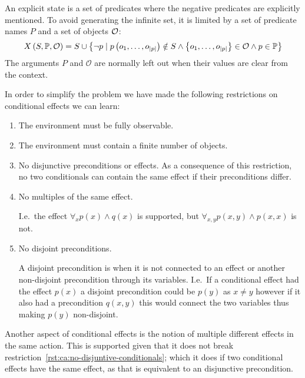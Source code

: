 \documentclass[\master/Master.tex]{subfiles}
\begin{document}
\begin{definition}
	An explicit state is a set of predicates where the negative predicates are explicitly mentioned. To avoid generating the infinite set, it is limited by a set of predicate names $P$ and a set of objects $\mathcal{O}$:
	\begin{equation*}
		X\left(S, \mathbb{P}, \mathcal{O}\right) = S \cup
		\left\{ \neg p \mid 
		p\left(o_1, \dots, o_{|p|}\right) \notin S \land 
		\left\{o_1, \dots, o_{|p|} \right\} \in \mathcal{O} \land
		p \in \mathbb{P}
		\right\}
	\end{equation*}
	The arguments $P$ and $\mathcal{O}$ are normally left out when their values are clear from the context.
\end{definition}

In order to simplify the problem we have made the following restrictions on conditional effects we can learn:
\begin{enumerate}[label=R\arabic*]
	\item The environment must be fully observable.
	\item The environment must contain a finite number of objects.
	\item \label{rst:ca:no-disjuntive-conditionals} No disjunctive preconditions or effects. As a consequence of this restriction, no two conditionals can contain the same effect if their preconditions differ.
	\item \label{rst:ca:no-multiple-effect} No multiples of the same effect.

		  I.e.\ the effect $\forall_x p(x) \land q(x)$ is supported, but $\forall_{x, y} p(x, y) \land p(x, x) $ is not.

	\item \label{rst:ca:no-disjoint-preconditions} No disjoint preconditions.

		  A disjoint precondition is when it is not connected to an effect or another non-disjoint precondition through its variables.
		  I.e.\ If a conditional effect had the effect $p(x)$ a disjoint precondition could be $p(y)$ as $x \neq y$ however if it also had a precondition $q(x,y)$ this would connect the two variables thus making $p(y)$ non-disjoint.
\end{enumerate}


Another aspect of conditional effects is the notion of multiple different effects in the same action. This is supported given that it does not break restriction~\ref{rst:ca:no-disjuntive-conditionals}; which it does if two conditional effects have the same effect, as that is equivalent to an disjunctive precondition.
\end{document}
